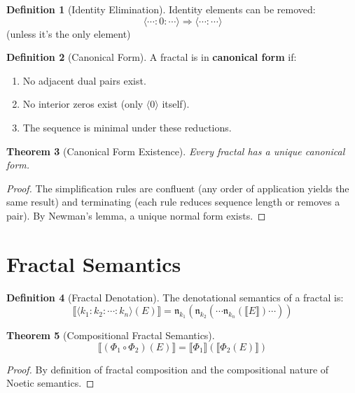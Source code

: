\documentclass[11pt,twoside,openright]{book}
\theoremstyle{definition}
\newtheorem{definition}{Definition}[chapter]
\theoremstyle{plain}
\newtheorem{theorem}[definition]{Theorem}
\theoremstyle{remark}
\newcommand{\sem}[1]{\llbracket #1 \rrbracket}
\newcommand{\Frac}{\Phi}
\begin{document}
\begin{definition}[Identity Elimination]
\label{def:id-elim}
Identity elements can be removed:
\[
\langle \cdots : 0 : \cdots \rangle \Rightarrow \langle \cdots : \cdots \rangle
\]
(unless it's the only element)
\end{definition}

\begin{definition}[Canonical Form]
\label{def:canonical-form}
A fractal is in \textbf{canonical form} if:
\begin{enumerate}
\item No adjacent dual pairs exist.
\item No interior zeros exist (only $\langle 0 \rangle$ itself).
\item The sequence is minimal under these reductions.
\end{enumerate}
\end{definition}

\begin{theorem}[Canonical Form Existence]
\label{thm:canonical-exists}
Every fractal has a unique canonical form.
\end{theorem}

\begin{proof}
The simplification rules are confluent (any order of application yields the same result) and terminating (each rule reduces sequence length or removes a pair). By Newman's lemma, a unique normal form exists.
\end{proof}

\section{Fractal Semantics}

\begin{definition}[Fractal Denotation]
\label{def:fractal-denote}
The denotational semantics of a fractal is:
\[
\sem{\langle k_1 : k_2 : \cdots : k_n \rangle(E)} = \mathfrak{n}_{k_1}(\mathfrak{n}_{k_2}(\cdots\mathfrak{n}_{k_n}(\sem{E})\cdots))
\]
\end{definition}

\begin{theorem}[Compositional Fractal Semantics]
\label{thm:fractal-compositional}
\[
\sem{(\Frac_1 \circ \Frac_2)(E)} = \sem{\Frac_1}(\sem{\Frac_2(E)})
\]
\end{theorem}

\begin{proof}
By definition of fractal composition and the compositional nature of Noetic semantics.
\end{proof}
\end{document}

